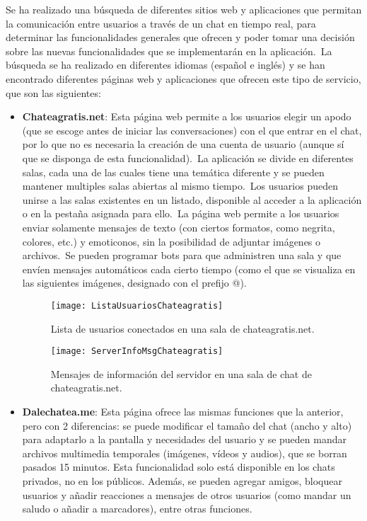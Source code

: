 
Se ha realizado una búsqueda de diferentes sitios web y aplicaciones que permitan la comunicación entre usuarios a
través de un chat en tiempo real, para determinar las funcionalidades generales que ofrecen y poder tomar una decisión
sobre las nuevas funcionalidades que se implementarán en la aplicación.\ La búsqueda se ha realizado en diferentes
idiomas (español e inglés) y se han encontrado diferentes páginas web y aplicaciones que ofrecen este tipo de
servicio, que son las siguientes:

\begin{itemize}
	\item \textbf{Chateagratis.net}: Esta página web permite a los usuarios elegir un apodo (que se escoge antes de
	iniciar las conversaciones) con el que entrar en el chat, por lo que no es necesaria la creación de una cuenta de
	usuario (aunque sí que se disponga de esta funcionalidad).\ La aplicación se divide en diferentes salas, cada una
	de las cuales tiene una temática diferente y se pueden mantener multiples salas abiertas al mismo tiempo.\ Los
	usuarios pueden unirse a las salas existentes en un listado, disponible al acceder a la aplicación o en la pestaña
	asignada para ello.\ La página web permite a los usuarios enviar solamente mensajes de texto (con ciertos
	formatos, como negrita, colores, etc.) y emoticonos, sin la posibilidad de adjuntar imágenes o archivos.\ Se pueden
	programar bots para que administren una sala y que envíen mensajes automáticos cada cierto tiempo (como el que
	se visualiza en las siguientes imágenes, designado con el prefijo @).

	\begin{figure}[H]
		\centering
		\texttt{[image: ListaUsuariosChateagratis]}
		\caption{Lista de usuarios conectados en una sala de chateagratis.net.}
		\label{fig:ListaUsuariosChateagratis}
	\end{figure}

	\begin{figure}[H]
		\centering
		\texttt{[image: ServerInfoMsgChateagratis]}
		\caption{Mensajes de información del servidor en una sala de chat de chateagratis.net.}
		\label{fig:ServerInfoMsgChateagratis}
	\end{figure}

	\item \textbf{Dalechatea.me}: Esta página ofrece las mismas funciones que la anterior, pero con 2 diferencias: se
	puede modificar el tamaño del chat (ancho y alto) para adaptarlo a la pantalla y necesidades del usuario y se
	pueden mandar archivos multimedia temporales (imágenes, vídeos y audios), que se borran pasados 15 minutos.
	Esta funcionalidad solo está disponible en los chats privados, no en los públicos.
	Además, se pueden agregar amigos, bloquear usuarios y añadir reacciones a mensajes de otros usuarios (como mandar
	un saludo o añadir a marcadores), entre otras funciones.


\end{itemize}
